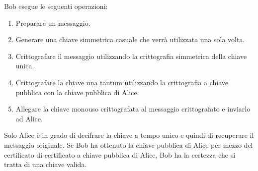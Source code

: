\singlespacing

Bob esegue le seguenti operazioni:

\begin{enumerate}

    \item Preparare un messaggio.
    
    \item Generare una chiave simmetrica casuale che verrà utilizzata una sola volta.
    
    \item Crittografare il messaggio utilizzando la crittografia simmetrica della chiave unica.
     
    \item Crittografare la chiave una tantum utilizzando la crittografia a chiave pubblica con la chiave pubblica di Alice.
    
    \item Allegare la chiave monouso crittografata al messaggio crittografato e inviarlo ad Alice.
    
\end{enumerate}
Solo Alice è in grado di decifrare la chiave a tempo unico e quindi di recuperare il messaggio originale. Se Bob ha ottenuto la chiave pubblica di Alice per mezzo del certificato di certificato a chiave pubblica di Alice, Bob ha la certezza che si tratta di una chiave valida.
